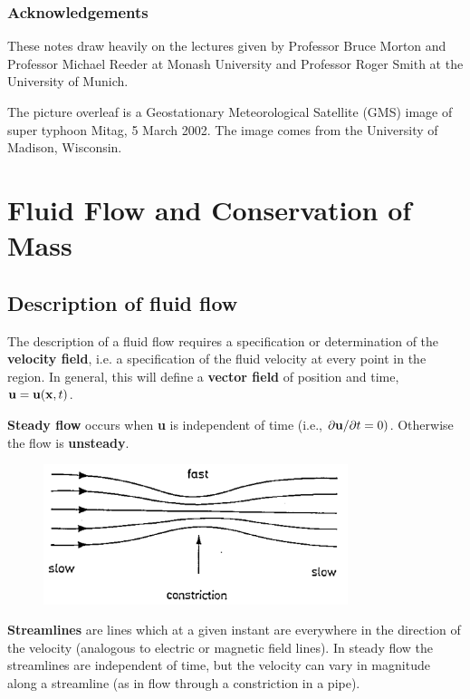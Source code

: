 \documentclass[twoside,a4paper,11pt]{report}
\begin{document}
\subsection*{Acknowledgements}

These notes draw heavily on the lectures given by Professor Bruce Morton and
Professor Michael Reeder at Monash University and Professor Roger Smith
at the University of Munich.

\smallskip
\noindent
The picture overleaf is a Geostationary Meteorological Satellite (GMS) image 
of super typhoon Mitag, 5 March 2002. The image comes from the University of 
Madison, Wisconsin. 



\thispagestyle{empty}
\cleardoublepage

\tableofcontents
\cleardoublepage


\chapter{Fluid Flow and Conservation of Mass}

\section{Description of fluid flow} The description of a fluid flow requires a
specification or determination of the \textbf{velocity field}, i.e. a
specification of the fluid velocity at every point in the region. In general,
this will define a \textbf{vector field} of position and time, ${\bf u}={\bf
u}({\bf x},t)$.

\textbf{Steady flow} occurs when \textbf{u} is independent of time (i.e.,
${\partial {\bf u}}/{\partial t}=0)$. Otherwise the flow is \textbf{unsteady}.

\begin{figure}[htbp]
\centerline{\includegraphics[width=3.5in]{Section3.pdf}}
\label{fig3}
\end{figure}

\textbf{Streamlines} are lines which at a given instant are everywhere in the
direction of the velocity (analogous to electric or magnetic field lines). In
steady flow the streamlines are independent of time, but the velocity can vary
in magnitude along a streamline (as in flow through a constriction in a pipe).
\end{document}
